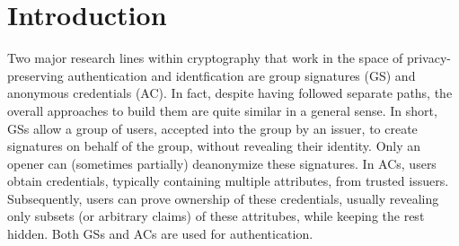 \section{Introduction}
\label{sec:introduction}


Two major research lines within cryptography that work in the space of
privacy-preserving authentication and identfication are group
signatures (GS) and anonymous credentials (AC). In fact, despite having followed
separate paths, the overall approaches to build them are quite similar in a
general sense.
%
In short, GSs allow a group of users, accepted into the group by an issuer, to
create signatures on behalf of the group, without revealing their identity. Only
an opener can (sometimes partially) deanonymize these signatures. In ACs, users
obtain credentials, typically containing multiple attributes, from trusted
issuers. Subsequently, users can prove ownership of these credentials, usually
revealing only subsets (or arbitrary claims) of these attritubes, while keeping
the rest hidden. Both GSs and ACs are used for authentication. 


